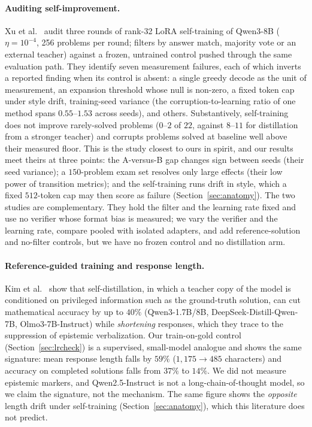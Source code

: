\documentclass[runningheads]{llncs}
\begin{document}
\paragraph{Auditing self-improvement.}
Xu et al.~\cite{ref_phantom} audit three rounds of rank-32 LoRA
self-training of Qwen3-8B ($\eta=10^{-4}$, 256 problems per round; filters
by answer match, majority vote or an external teacher) against a frozen,
untrained control pushed through the same evaluation path. They identify
seven measurement failures, each of which inverts a reported finding when its
control is absent: a single greedy decode as the unit of measurement, an
expansion threshold whose null is non-zero, a fixed token cap under style
drift, training-seed variance (the corruption-to-learning ratio of one method
spans $0.55$--$1.53$ across seeds), and others. Substantively, self-training
does not improve rarely-solved problems ($0$--$2$ of $22$, against $8$--$11$
for distillation from a stronger teacher) and corrupts problems solved at
baseline well above their measured floor. This is the study closest to ours
in spirit, and our results meet theirs at three points: the A-versus-B gap
changes sign between seeds (their seed variance); a $150$-problem exam set
resolves only large effects (their low power of transition metrics); and
the self-training runs drift in style, which a fixed $512$-token cap may
then score as failure (Section~\ref{sec:anatomy}). The two studies are
complementary. They hold the filter and the learning rate fixed and use no
verifier whose format bias is measured; we vary the verifier and the
learning rate, compare pooled with isolated adapters, and add reference-solution
and no-filter controls, but we have no frozen control and no distillation arm.

\paragraph{Reference-guided training and response length.}
Kim et al.~\cite{ref_selfdistill} show that self-distillation, in which a
teacher copy of the model is conditioned on privileged information such as the
ground-truth solution, can cut mathematical accuracy by up to $40\%$
(Qwen3-1.7B/8B, DeepSeek-Distill-Qwen-7B, Olmo3-7B-Instruct) while
\emph{shortening} responses, which they trace to the suppression of epistemic
verbalization. Our train-on-gold control (Section~\ref{sec:lrcheck}) is a
supervised, small-model analogue and shows the same signature: mean response
length falls by $59\%$ ($1{,}175\to485$ characters) and accuracy on completed
solutions falls from $37\%$ to $14\%$. We did not measure epistemic markers,
and Qwen2.5-Instruct is not a long-chain-of-thought model, so we claim the
signature, not the mechanism. The same figure shows the \emph{opposite} length
drift under self-training (Section~\ref{sec:anatomy}), which this literature
does not predict.
\end{document}
